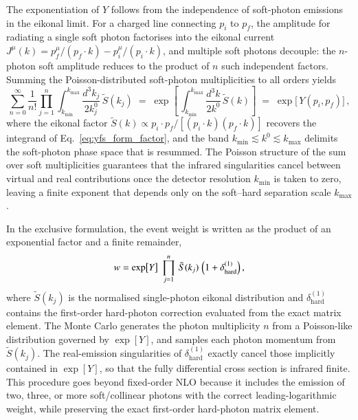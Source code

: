 The exponentiation of $Y$ follows from the independence of soft-photon emissions
in the eikonal limit. For a charged line connecting $p_i$ to $p_f$, the amplitude
for radiating a single soft photon factorises into the eikonal current
$J^\mu(k) = p_f^\mu/(p_f\!\cdot\!k) - p_i^\mu/(p_i\!\cdot\!k)$, and multiple
soft photons decouple: the $n$-photon soft amplitude reduces to the product of
$n$ such independent factors. Summing the Poisson-distributed soft-photon
multiplicities to all orders yields
\begin{equation}
    \sum_{n=0}^{\infty} \frac{1}{n!} \prod_{j=1}^{n} \int_{k_{\min}}^{k_{\max}}
    \frac{d^{3}k_{j}}{2k_{j}^{0}} \,
    \tilde{S}(k_{j})
    \;=\; \exp\!\left[\, \int_{k_{\min}}^{k_{\max}}
    \frac{d^{3}k}{2k^{0}} \, \tilde{S}(k) \right]
    \;=\; \exp\bigl[\,Y(p_i,p_f)\bigr]\,,
    \label{eq:yfs_exponentiation}
\end{equation}
where the eikonal factor
$\tilde{S}(k) \propto p_i\!\cdot\!p_f / [(p_i\!\cdot\!k)(p_f\!\cdot\!k)]$
recovers the integrand of Eq.~\eqref{eq:yfs_form_factor}, and the band
$k_{\min}\lesssim k^0\lesssim k_{\max}$ delimits the soft-photon phase space
that is resummed. The Poisson structure of the sum over soft multiplicities
guarantees that the infrared singularities cancel between virtual and real
contributions once the detector resolution $k_{\min}$ is taken to zero,
leaving a finite exponent that depends only on the soft--hard separation
scale $k_{\max}$.

In the exclusive formulation, the event weight is written as the product of an exponential factor and a finite remainder,
\begin{equation}
    w = \exp\bigl[Y\bigr]\;\prod_{j=1}^{n}\,\tilde{S}(k_j)\;
    \Bigl( 1 + \delta^{(1)}_{\mathrm{hard}}\Bigr)\,,
    \label{eq:yfs_weight}
\end{equation}
where $\tilde{S}(k_j)$ is the normalised single-photon eikonal distribution and $\delta^{(1)}_{\mathrm{hard}}$ contains the first-order hard-photon correction evaluated from the exact matrix element. The Monte Carlo generates the photon multiplicity $n$ from a Poisson-like distribution governed by $\exp[Y]$, and samples each photon momentum from $\tilde{S}(k_j)$. The real-emission singularities of $\delta^{(1)}_{\mathrm{hard}}$ exactly cancel those implicitly contained in $\exp[Y]$, so that the fully differential cross section is infrared finite. This procedure goes beyond fixed-order NLO because it includes the emission of two, three, or more soft/collinear photons with the correct leading-logarithmic weight, while preserving the exact first-order hard-photon matrix element.

